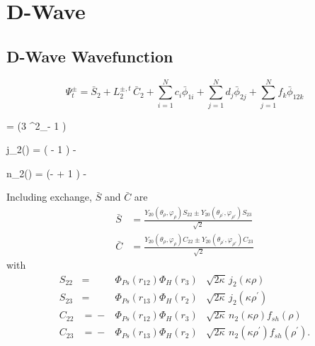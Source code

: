 \documentclass[Dissertation.tex]{subfiles}
\begin{document}
\chapter{D-Wave}
\label{chp:DWave}


\section{D-Wave Wavefunction}
\label{sec:DWaveFn}

\begin{equation}
\Psi_t^\pm = \bar{S}_2 + L_2^{\pm,t} \, \bar{C}_2 + \sum_{i=1}^N c_i \bar{\phi}_{1i} + \sum_{j=1}^N d_j \bar{\phi}_{2j} + \sum_{j=1}^N f_k \bar{\phi}_{12k}
\label{eq:DWaveTrial}
\end{equation}


\beq
\label{eq:DWaveSpherHarm}
 =  \left(3 \cos^2\theta_\rho - 1 \right)
\eeq

\beq
j_2(\kappa \rho) = \left( - 1 \right) \frac{\sin(\kappa\rho)}{\kappa\rho} - 
\eeq

\beq
n_2(\kappa \rho) = \left(- + 1 \right) \frac{\cos(\kappa\rho)}{\kappa\rho} - 
\eeq



\noindent Including exchange, $\bar{S}$ and $\bar{C}$ are
\begin{subequations}
\label{eq:DWaveSandCBar}
\begin{align}
\bar{S} &= \frac{Y_{20}(\theta_\rho,\varphi_\rho)S_{22} \pm Y_{20}(\theta_{\rho^\prime},\varphi_{\rho'})S_{23} }{\sqrt{2}} \label{eq:DWaveSBar} \\
\bar{C} &= \frac{Y_{20}(\theta_\rho,\varphi_\rho)C_{22} \pm Y_{20}(\theta_{\rho^\prime},\varphi_{\rho'})C_{23} }{\sqrt{2}} \label{eq:DWaveCBar} 
\end{align}
\end{subequations}
with
\begin{subequations}
\label{eq:DWaveSandC}
\begin{alignat}{2}
S_{22} &={}&\Phi_{Ps}\left(r_{12}\right) \Phi_H\left(r_3\right) &\sqrt{2\kappa} \,j_2\!\left(\kappa\rho\right) \label{eq:DWaveS22Def} \\
S_{23} &={}&\Phi_{Ps}\left(r_{13}\right) \Phi_H\left(r_2\right) &\sqrt{2\kappa} \,j_2\!\left(\kappa\rho^\prime\right) \label{eq:DWaveS23Def} \\
C_{22} &={}-&\Phi_{Ps}\left(r_{12}\right) \Phi_H\left(r_3\right) &\sqrt{2\kappa} \,n_2\!\left(\kappa\rho\right) f_{sh}(\rho) \label{eq:DWaveC22Def} \\
C_{23} &={}-&\Phi_{Ps}\left(r_{13}\right) \Phi_H\left(r_2\right) &\sqrt{2\kappa} \,n_2\!\left(\kappa\rho^\prime\right) f_{sh}(\rho^\prime). \label{eq:DWaveC23Def}
\end{alignat}
\end{subequations}
\end{document}
